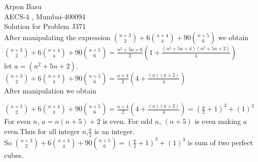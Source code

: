 \documentclass[20pt,a4paper]{extarticle}
\begin{document}
 
 Arpon Basu\\
 AECS-4 , Mumbai-400094\\
 
 Solution for Problem J371 \\
 
 
 After manipulating the expression $ {n+3 \choose 2} + 6{n+4 \choose 4} + 90{n+5 \choose 6}$ we obtain \\
 

 $ {n+3 \choose 2} + 6{n+4 \choose 4} + 90{n+5 \choose 6}=\frac{n^{2}+5n+6}{2} (1+ \frac{(n^{2}+5n+4)(n^{2}+5n+2)}{4})$ \\
 
 
 let $a=(n^{2}+5n+2).$\\
 
 $ {n+3 \choose 2} + 6{n+4 \choose 4} + 90{n+5 \choose 6}=\frac{a+4}{2} (4+ \frac{(a)(a+2)}{4})$ \\
 
 After manipulation we obtain 
 
 $ {n+3 \choose 2} + 6{n+4 \choose 4} + 90{n+5 \choose 6}=\frac{a+4}{2} (4+ \frac{(a)(a+2)}{4})=(\frac{a}{2}+1)^{3}+(1)^3$ \\
 
  For even $n$, $a=n(n+5)+2$ is even. For odd $n$, $(n+5)$ is even making $a$ even.Thus for all integer $n$,$\frac{a}{2}$ is an integer.\\
  So $ {n+3 \choose 2} + 6{n+4 \choose 4} + 90{n+5 \choose 6}=(\frac{a}{2}+1)^{3}+(1)^3$ is sum of two perfect cubes. 
 
 
\end{document}
